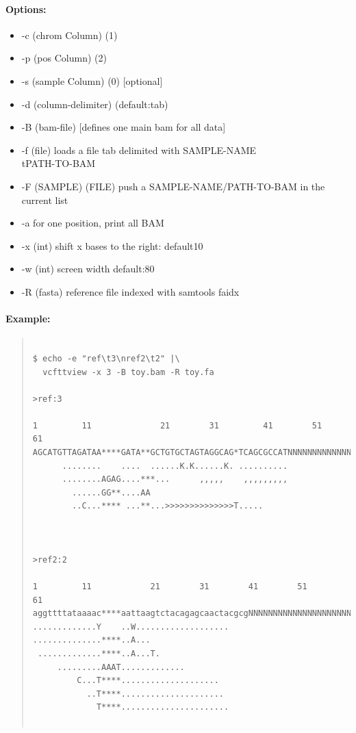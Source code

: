 \documentclass[12pt]{article}
\begin{document}
\paragraph{Options:}
\begin{itemize}
\item-c (chrom Column) (1)
\item-p (pos Column) (2)
\item-s (sample Column) (0) [optional]
\item-d (column-delimiter) (default:tab)
\item-B (bam-file) [defines one main bam for all data]
\item-f (file) loads a file tab delimited with SAMPLE-NAME\\tPATH-TO-BAM
\item-F (SAMPLE) (FILE)  push a SAMPLE-NAME/PATH-TO-BAM in the current list
\item-a for one position, print all BAM
\item-x (int) shift x bases to the right: default10
\item-w (int) screen width default:80
\item-R (fasta) reference file indexed with samtools faidx 
\end{itemize}
\paragraph{Example:}
\begin{quote}
\begin{verbatim}

$ echo -e "ref\t3\nref2\t2" |\
  vcfttview -x 3 -B toy.bam -R toy.fa

>ref:3

1         11              21        31         41        51        61           
AGCATGTTAGATAA****GATA**GCTGTGCTAGTAGGCAG*TCAGCGCCATNNNNNNNNNNNNNNNNNNNNNNNNNNNN
      ........    ....  ......K.K......K. ..........                            
      ........AGAG....***...      ,,,,,    ,,,,,,,,,                            
        ......GG**....AA                                                        
        ..C...**** ...**...>>>>>>>>>>>>>>T.....                                 



>ref2:2

1         11            21        31        41        51        61              
aggttttataaaac****aattaagtctacagagcaactacgcgNNNNNNNNNNNNNNNNNNNNNNNNNNNNNNNNNNNN
.............Y    ..W...................                                        
..............****..A...                                                        
 .............****..A...T.                                                      
     .........AAAT.............                                                 
         C...T****....................                                          
           ..T****.....................                                         
             T****......................                                        
                                                               
\end{verbatim}
\end{quote}
\end{document}
